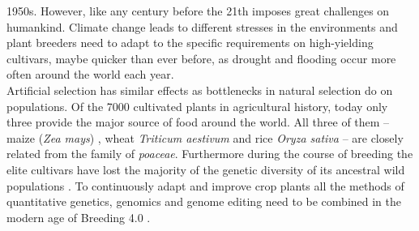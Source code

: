 1950s. However, like any century before the 21th imposes great challenges on
humankind. Climate change leads to different stresses in the environments and plant
breeders need to adapt to the specific requirements on high-yielding cultivars, maybe
quicker than ever before, as drought and flooding occur more often around the world each
year. \\
Artificial selection has similar effects as bottlenecks in natural selection do on
populations.  Of the 7000 cultivated plants in agricultural history, today only three
provide the major source of food around the world. All three of them -- maize (\textit{Zea
  mays}) , wheat \textit{Triticum aestivum} and rice \textit{Oryza sativa} -- are closely
related from the family of \textit{poaceae}. Furthermore during the course of breeding the
elite cultivars have lost the majority of the genetic diversity of its ancestral wild
populations \cite{walsh2018}. To continuously adapt and improve crop plants all the
methods of quantitative genetics, genomics and genome editing need to be combined in the
modern age of Breeding 4.0 \cite{wallace2018road}.

